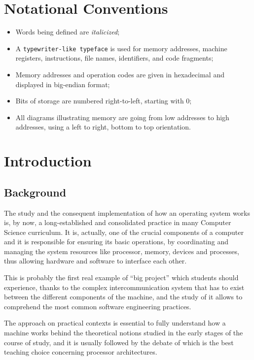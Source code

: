 \documentclass[12pt,a4paper,openright,twoside]{report}
\begin{document}
\chapter*{Notational Conventions}
\begin{itemize}
	\item Words being defined are \textit{italicized};
	\item A \texttt{typewriter-like typeface} is used for memory addresses, machine registers, instructions, file names, identifiers, and code fragments;
	\item Memory addresses and operation codes are given in hexadecimal and displayed in big-endian format;
	\item Bits of storage are numbered right-to-left, starting with 0;
	\item All diagrams illustrating memory are going from low addresses to high addresses, using a left to right, bottom to top orientation.
\end{itemize}

\clearpage{\pagestyle{empty}\cleardoublepage}
\chapter{Introduction}
\lhead[\fancyplain{}{\bfseries\thepage}]{\fancyplain{}{\bfseries\rightmark}}

\section{Background}
The study and the consequent implementation of how an operating system works is, by now, a long-established and consolidated practice in many Computer Science curriculum.
It is, actually, one of the crucial components of a computer and it is responsible for ensuring its basic operations, by coordinating and managing the system resources like processor, memory, devices and processes, thus allowing hardware and software to interface each other.

This is probably the first real example of ``big project'' which students should experience, thanks to the complex intercommunication system that has to exist between the different components of the machine, and the study of it allows to comprehend the most common software engineering practices.

The approach on practical contexts is essential to fully understand how a machine works behind the theoretical notions studied in the early stages of the course of study, and it is usually followed by the debate of which is the best teaching choice concerning processor architectures.
\end{document}
